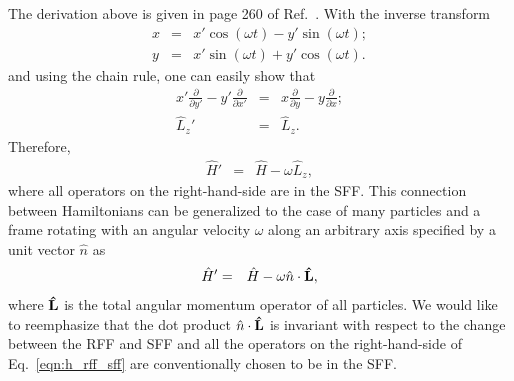 \documentclass[12pt]{iopart}
\begin{document}
The derivation above is given in page 260 of Ref.~\cite{untracold_qf_stoof}. With the inverse transform
\begin{eqnarray}
x&=&x'\cos \left( \omega t \right)-y'\sin\left( \omega t \right); \nonumber \\
y&=&x'\sin\left( \omega t \right)+y'\cos\left( \omega t \right). \label{eqn:xy}
\end{eqnarray}
and using the chain rule, one can easily show that
\begin{eqnarray}
x'\frac{\partial}{\partial y'}-y'\frac{\partial}{\partial x'}&=&x\frac{\partial}{\partial y}-y\frac{\partial}{\partial x}; \nonumber\\
\hat{L}_z'&=&\hat{L}_z.
\end{eqnarray}
Therefore,
\begin{eqnarray}
\hat{H}'&=&\hat{H}-\omega\hat{L}_z,
\end{eqnarray}
where all operators on the right-hand-side are in the SFF. This connection between Hamiltonians can be generalized to the case of many particles and a frame rotating with an angular velocity $\omega$ along an arbitrary axis specified by a unit vector $\hat{n}$ as
\begin{eqnarray}
\hat{H}'&=&\hat{H}-\omega \hat{n} \cdot{\bf \hat{ L}},\label{eqn:h_rff_sff}
\end{eqnarray}
where ${\bf \hat{ L}}$ is  the total angular momentum operator of all particles. We would like to reemphasize that the dot product $\hat{n} \cdot{\bf \hat{ L}}$ is invariant  with respect to the change between the RFF and SFF and all the operators on the right-hand-side of Eq.~\ref{eqn:h_rff_sff} are conventionally chosen to be in the SFF.
\end{document}
